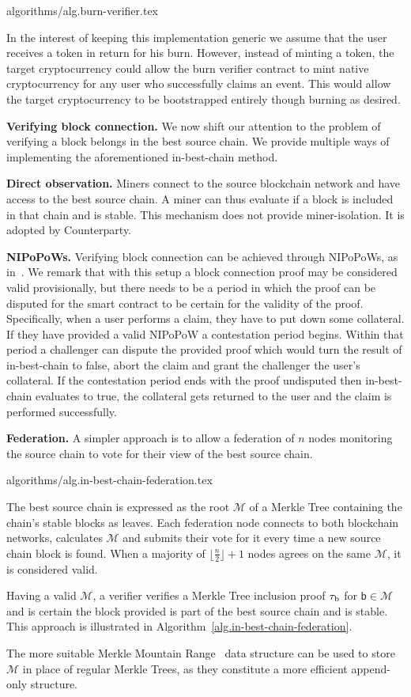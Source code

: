 {algorithms/alg.burn-verifier.tex}

In the interest of keeping this implementation generic we assume that the user receives a token in return for his burn. However, instead of minting a token, the target cryptocurrency could allow the burn verifier contract to mint native cryptocurrency for any user who successfully claims an event. This would allow the target cryptocurrency to be bootstrapped entirely though burning as desired.

\noindent
\textbf{Verifying block connection.}
We now shift our attention to the problem of verifying a block belongs in the best source chain. We provide multiple ways of implementing the aforementioned \textsf{in-best-chain} method.

\noindent
\textbf{Direct observation.}
Miners connect to the source blockchain network and have access to the best source chain. A miner can thus evaluate if a block is included in that chain and is stable. This mechanism does not provide miner-isolation. It is adopted by Counterparty.

\noindent
\textbf{NIPoPoWs.}
Verifying block connection can be achieved through NIPoPoWs, as in~\cite{pow-sidechains}.
We remark that with this setup a block connection proof may be considered valid provisionally, but there needs to be a period in which the proof can be disputed for the smart contract to be certain for the validity of the proof. Specifically, when a user performs a claim, they have to put down some collateral. If they have provided a valid NIPoPoW a contestation period begins. Within that period a challenger can dispute the provided proof which would turn the result of \textsf{in-best-chain} to false, abort the claim and grant the challenger the user's collateral. If the contestation period ends with the proof undisputed then \textsf{in-best-chain} evaluates to true, the collateral gets returned to the user and the claim is performed successfully.

\noindent
\textbf{Federation.}
A simpler approach is to allow a federation of $n$ nodes monitoring the source chain to vote for their view of the best source chain.

{algorithms/alg.in-best-chain-federation.tex}

The best source chain is expressed as the root $\mathcal{M}$ of a Merkle Tree containing the chain's stable blocks as leaves. Each federation node connects to both blockchain networks, calculates $\mathcal{M}$ and submits their vote for it every time a new source chain block is found. When a majority of $\lfloor\frac{n}{2}\rfloor + 1$ nodes agrees on the same $\mathcal{M}$, it is considered valid.

Having a valid $\mathcal{M}$, a verifier verifies a Merkle Tree inclusion proof $\tau_\text{b}$ for $\textsf{b} \in \mathcal{M}$ and is certain the block provided is part of the best source chain and is stable. This approach is illustrated in Algorithm~\ref{alg.in-best-chain-federation}.

The more suitable Merkle Mountain Range~\cite{flyclient} data structure can be used to store $\mathcal{M}$ in place of regular Merkle Trees, as they constitute a more efficient append-only structure.
